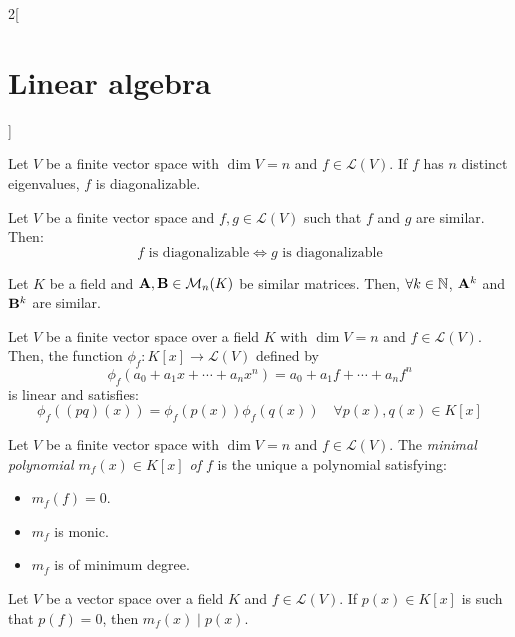 \documentclass[../../../main.tex]{subfiles}
\begin{document}
\begin{multicols}{2}[\section{Linear algebra}]
\begin{theorem}
  \end{theorem}
  \begin{corollary}
    Let $V$ be a finite vector space with $\dim V=n$ and $f\in\mathcal{L}(V)$. If $f$ has $n$ distinct eigenvalues, $f$ is diagonalizable.
  \end{corollary}
  \begin{prop}
    Let $V$ be a finite vector space and $f,g\in\mathcal{L}(V)$ such that $f$ and $g$ are similar. Then: $$f\text{ is diagonalizable}\iff g\text{ is diagonalizable}$$
  \end{prop}
  \begin{lemma}
    Let $K$ be a field and $\vb{A},\vb{B}\in\mathcal{M}_n(K)$ be similar matrices. Then, $\forall k\in\mathbb{N}$, $\vb{A}^k$ and $\vb{B}^k$ are similar.
  \end{lemma}
  \begin{lemma}
    Let $V$ be a finite vector space over a field $K$ with $\dim V=n$ and $f\in\mathcal{L}(V)$. Then, the function $\phi_f:K[x]\rightarrow\mathcal{L}(V)$ defined by $$\phi_f(a_0+a_1x+\cdots+a_nx^n)=a_0+a_1f+\cdots+a_nf^n$$
    is linear and satisfies: $$\phi_f((pq)(x))=\phi_f(p(x))\phi_f(q(x))\quad\forall p(x),q(x)\in K[x]$$
  \end{lemma}
  \begin{definition}
    Let $V$ be a finite vector space with $\dim V=n$ and $f\in\mathcal{L}(V)$. The \textit{minimal polynomial $m_f(x)\in K[x]$ of $f$} is the unique a polynomial satisfying:
    \begin{itemize}
      \item $m_f(f)=0$.
      \item $m_f$ is monic.
      \item $m_f$ is of minimum degree.
    \end{itemize}
  \end{definition}
  \begin{prop}
    Let $V$ be a vector space over a field $K$ and $f\in\mathcal{L}(V)$. If $p(x)\in K[x]$ is such that $p(f)=0$, then $m_f(x)\mid p(x)$.
  \end{prop}

\end{multicols}
\end{document}
